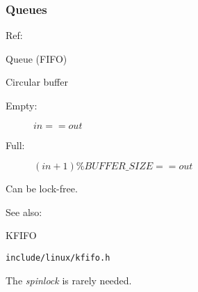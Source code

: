 \subsubsection{Queues}

Ref: 

\begin{frame}{Queue (FIFO)}
  \begin{minipage}{.73\linewidth}
    \begin{block}{Circular buffer}
      \begin{description}
      \item[Empty:] $in == out$
      \item[Full:] $(in+1) \% BUFFER\_SIZE == out$
      \end{description}
    \end{block}
    Can be lock-free.
  \end{minipage}\hfill
  \begin{minipage}{.25\linewidth}
    \begin{center}
    \end{center}
  \end{minipage}
\end{frame}

See also: 

\begin{frame}{KFIFO}
  \begin{block}{\texttt{include/linux/kfifo.h}}
    \begin{center}
    \end{center}
  \end{block}
  The \emph{spinlock} is rarely needed.
\end{frame}

